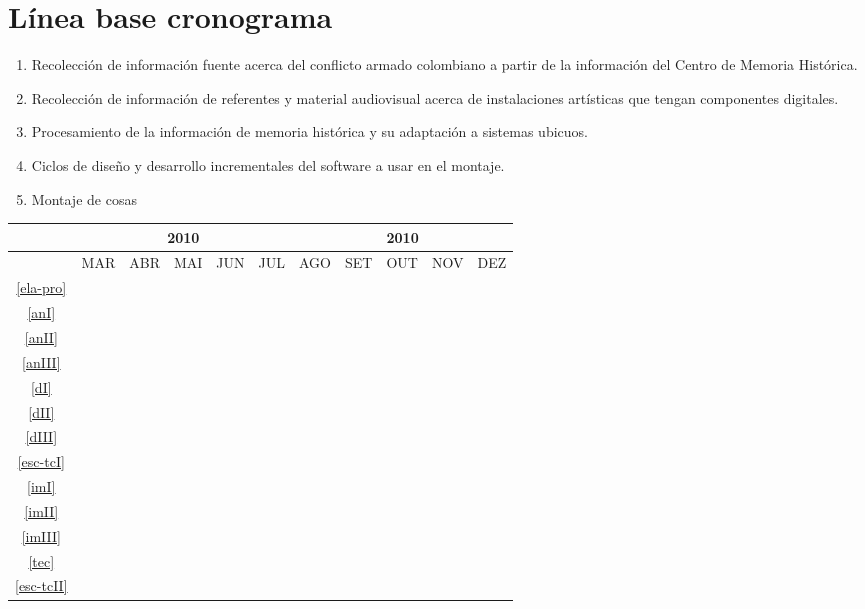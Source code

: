 \section{Línea base cronograma}

\begin{enumerate}
	\item \label{puntouno} Recolección de información fuente acerca del conflicto armado colombiano a partir de la información del Centro de Memoria Histórica.
	\item \label{puntodos} Recolección de información de referentes y material audiovisual acerca de instalaciones artísticas que tengan componentes digitales.
	\item \label{puntotres} Procesamiento de la información de memoria histórica y su adaptación a sistemas ubicuos.
	\item \label{puntocuatro} Ciclos de diseño y desarrollo incrementales del software a usar en el montaje.
	\item \label{puntocinco} Montaje de cosas

\end{enumerate}

\begin{table}[!htbp]
	\centering
		\begin{tabular}{|c|c|c|c|c|c|c|c|c|c|c|}
		\hline
		&\multicolumn{5}{c|}{2010}&\multicolumn{5}{c|}{2010}\\
		\hline
		&MAR&ABR&MAI&JUN&JUL&AGO&SET&OUT&NOV&DEZ\\
		\hline
		\ref{ela-pro}&\cellcolor{midgray}&&&&&&&&&\\
		\hline
		\ref{anI}&&\cellcolor{midgray}&&&&&&&&\\
		\hline
		\ref{anII}&&\cellcolor{midgray}&&&&&&&&\\
		\hline
		\ref{anIII}&&\cellcolor{midgray}&\cellcolor{midgray}&&&&&&&\\
		\hline
		\ref{dI}&&&\cellcolor{midgray}&&&&&&&\\
		\hline
		\ref{dII}&&&\cellcolor{midgray}&\cellcolor{midgray}&&&&&&\\
		\hline
		\ref{dIII}&&&&\cellcolor{midgray}&\cellcolor{midgray}&&&&&\\
		\hline
		\ref{esc-tcI}&&&\cellcolor{midgray}&\cellcolor{midgray}&\cellcolor{midgray}&&&&&\\
		\hline
		\ref{imI}&&&&&\cellcolor{midgray}&&&&&\\
		\hline
		\ref{imII}&&&&&&\cellcolor{midgray}&&&&\\
		\hline
		\ref{imIII}&&&&&&\cellcolor{midgray}&\cellcolor{midgray}&\cellcolor{midgray}&&\\
		\hline
		\ref{tec}&&&&&&&&\cellcolor{midgray}&\cellcolor{midgray}&\\
		\hline
		\ref{esc-tcII}&&&&&&&&\cellcolor{midgray}&\cellcolor{midgray}&\cellcolor{midgray}\\
		\hline
		\end{tabular}
\end{table}

